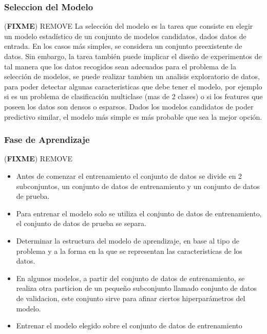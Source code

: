 \documentclass[a4paper,11pt,spanish]{book}
\newcommand*{\FIXME}[1]{{(\textbf{FIXME}) {#1}}}
\begin{document}
	\subsubsection {Seleccion del Modelo} \FIXME{REMOVE}
	  La selección del modelo es la tarea que consiste en elegir un modelo estadístico de un conjunto de modelos candidatos, dados datos de entrada.
	  En los casos más simples, se considera un conjunto preexistente de datos.
	  Sin embargo, la tarea también puede implicar el diseño de experimentos de tal manera que los datos recogidos sean adecuados para el problema de la selección de modelos,
	  se puede realizar tambien un analisis exploratorio de datos, para poder detectar algunas caracteristicas que debe tener el modelo, por ejemplo si es un problema de clasificación
	  multiclase (mas de 2 clases) o si los features que poseen los datos son densos o esparsos.
	  Dados los modelos candidatos de poder predictivo similar, el modelo más simple es más probable que sea la mejor opción.

	\subsubsection {Fase de Aprendizaje}\FIXME{REMOVE}
	  \begin{itemize}
	    \item Antes de comenzar el entrenamiento el conjunto de datos se divide en 2 subconjuntos, un conjunto de datos de entrenamiento y un conjunto de datos de prueba.
	    \item Para entrenar el modelo solo se utiliza el conjunto de datos de entrenamiento, el conjunto de datos de prueba se separa.
	    \item Determinar la estructura del modelo de aprendizaje, en base al tipo de problema y a la forma en la que se representan las caracteristicas de los datos.
	    \item En algunos modelos, a partir del conjunto de datos de entrenamiento, se realiza otra particion de un pequeño subconjunto llamado conjunto de datos de validacion, este conjunto sirve
	    para afinar ciertos hiperparámetros del modelo.
	    \item Entrenar el modelo elegido sobre el conjunto de datos de entrenamiento
	  \end{itemize}
\end{document}
